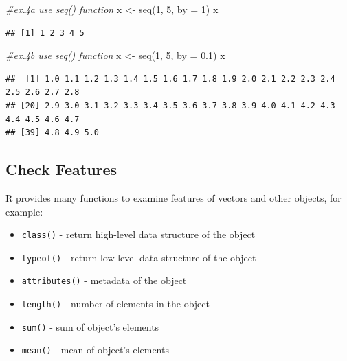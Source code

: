 \documentclass[
]{book}
\newenvironment{Shaded}{\begin{snugshade}}{\end{snugshade}}
\newcommand{\AttributeTok}[1]{\textcolor[rgb]{0.77,0.63,0.00}{#1}}
\newcommand{\CommentTok}[1]{\textcolor[rgb]{0.56,0.35,0.01}{\textit{#1}}}
\newcommand{\DecValTok}[1]{\textcolor[rgb]{0.00,0.00,0.81}{#1}}
\newcommand{\FloatTok}[1]{\textcolor[rgb]{0.00,0.00,0.81}{#1}}
\newcommand{\FunctionTok}[1]{\textcolor[rgb]{0.00,0.00,0.00}{#1}}
\newcommand{\NormalTok}[1]{#1}
\newcommand{\OtherTok}[1]{\textcolor[rgb]{0.56,0.35,0.01}{#1}}
\providecommand{\tightlist}{%
  \setlength{\itemsep}{0pt}\setlength{\parskip}{0pt}}
\begin{document}
\begin{Shaded}
\begin{Highlighting}[]
\CommentTok{\#ex.4a use seq() function}
\NormalTok{x }\OtherTok{\textless{}{-}} \FunctionTok{seq}\NormalTok{(}\DecValTok{1}\NormalTok{, }\DecValTok{5}\NormalTok{, }\AttributeTok{by =} \DecValTok{1}\NormalTok{)}
\NormalTok{x}
\end{Highlighting}
\end{Shaded}

\begin{verbatim}
## [1] 1 2 3 4 5
\end{verbatim}

\begin{Shaded}
\begin{Highlighting}[]
\CommentTok{\#ex.4b use seq() function}
\NormalTok{x }\OtherTok{\textless{}{-}} \FunctionTok{seq}\NormalTok{(}\DecValTok{1}\NormalTok{, }\DecValTok{5}\NormalTok{, }\AttributeTok{by =} \FloatTok{0.1}\NormalTok{)}
\NormalTok{x}
\end{Highlighting}
\end{Shaded}

\begin{verbatim}
##  [1] 1.0 1.1 1.2 1.3 1.4 1.5 1.6 1.7 1.8 1.9 2.0 2.1 2.2 2.3 2.4 2.5 2.6 2.7 2.8
## [20] 2.9 3.0 3.1 3.2 3.3 3.4 3.5 3.6 3.7 3.8 3.9 4.0 4.1 4.2 4.3 4.4 4.5 4.6 4.7
## [39] 4.8 4.9 5.0
\end{verbatim}

\hypertarget{check-features}{%
\subsection{Check Features}\label{check-features}}

R provides many functions to examine features of vectors and other objects, for example:

\begin{itemize}
\tightlist
\item
  \texttt{class()} - return high-level data structure of the object
\item
  \texttt{typeof()} - return low-level data structure of the object
\item
  \texttt{attributes()} - metadata of the object
\item
  \texttt{length()} - number of elements in the object
\item
  \texttt{sum()} - sum of object's elements
\item
  \texttt{mean()} - mean of object's elements
\end{itemize}
\end{document}
